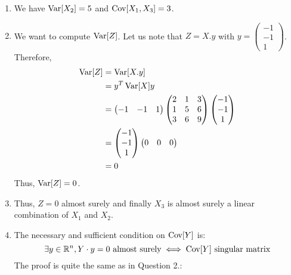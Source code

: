 \begin{solution}
  \begin{enumerate}
    \item We have $\operatorname{Var}[X_2] = 5$ and $\operatorname{Cov}[X_1, X_3] = 3$.
    \item We want to compute $\operatorname{Var}[Z]$. Let us note that $Z = X . y$ with $y = \begin{pmatrix} -1 \\ -1 \\ 1 \end{pmatrix}$. Therefore,
          \begin{align*}
            \operatorname{Var}[Z] & = \operatorname{Var}[X.y]     \\
                    & = y^T \operatorname{Var}[X] y \\
                    & =
            \begin{pmatrix}
              -1 & -1 & 1
            \end{pmatrix}
            \begin{pmatrix}
              2 & 1 & 3 \\
              1 & 5 & 6 \\
              3 & 6 & 9
            \end{pmatrix}
            \begin{pmatrix}
              -1 \\ -1 \\ 1
            \end{pmatrix}            \\
                    & =
            \begin{pmatrix}
              -1 \\ -1 \\ 1
            \end{pmatrix}
            \begin{pmatrix}
              0 & 0 & 0
            \end{pmatrix}            \\
                    & = 0
          \end{align*}
          Thus, $\operatorname{Var}[Z] = 0$.
    \item Thus, $Z = 0$ almost surely and finally $X_3$ is almost surely a linear combination of $X_1$ and $X_2$.
    \item The necessary and sufficient condition on $\operatorname{Cov}[Y]$ is:
          \[
            \exists y\in \mathbb{R}^n, Y \cdot y = 0 \text{ almost surely} \iff \operatorname{Cov}[Y] \text{ singular matrix}
          \]
          The proof is quite the same as in Question 2.:
          \begin{align*}

\end{align*}
\end{enumerate}
\end{solution}
